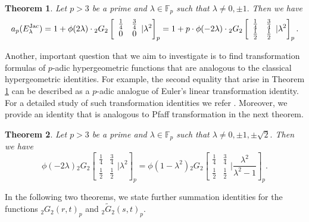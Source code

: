 \documentclass[12pt]{amsart}
\theoremstyle{plain}
\newtheorem{theorem}{Theorem}[section]
\theoremstyle{definition}
\theoremstyle{remark}
\newcommand{\jac}{\text{{\rm{Jac}}}}
\numberwithin{equation}{section}
\begin{document}
	\begin{theorem}\label{theorem-Jacobi}
	Let $p>3$ be a prime and $\lambda\in \mathbb{F}_p$ such that $\lambda\neq0, \pm 1.$ Then we have 
	$$ 
	a_p(E^{\jac}_{\lambda})=1+\phi(2\lambda) \cdot{_2G_2}\left[\begin{array}{cc}
\frac{1}{4}   & \frac{3}{4} \\
  0    & 0  \end{array}|{\lambda^2}\right]_p=1+p\cdot\phi(-2\lambda)\cdot {_2G_2}\left[\begin{array}{cc}
\frac{1}{4}   & \frac{3}{4} \\
  \frac{1}{2}    & \frac{1}{2}  \end{array}|{\lambda^2}\right]_p.$$
\end{theorem}
Another, important question that we aim to investigate is to find transformation formulas of $p$-adic hypergeometric functions that are analogous to the classical hypergeometric identities. For example, the second equality that arise in Theorem \ref{theorem-Jacobi} can be described as a $p$-adic analogue of Euler's linear transformation identity. For a detailed study of such transformation identities we refer \cite{Askey, bailey}. Moreover, we provide an identity that is analogous to Pfaff transformation in the next theorem.	
	
	
	\begin{theorem}\label{theorem-Jacobi trans}
	Let $p>3$ be a prime and $\lambda\in \mathbb{F}_p$ such that $\lambda\neq0, \pm 1, \pm\sqrt{2}.$ Then we have 
	$$ 
	\phi(-2\lambda){_2G_2}\left[\begin{array}{cc}
\frac{1}{4}   & \frac{3}{4} \\
  \frac{1}{2}    & \frac{1}{2}  \end{array}|{\lambda^2}\right]_p=\phi(1-\lambda^2){_2G_2}\left[\begin{array}{cc}
\frac{1}{4}   & \frac{3}{4} \\
  \frac{1}{2}    & \frac{1}{2}  \end{array}|\frac{\lambda^2}{\lambda^2-1}\right]_p.$$ 
  \end{theorem}
	
In the following two theorems, we state further summation identities for the functions ${_2G_2}(r,t)_p$ and $\tilde{_2G_2}(s,t)_p.$	
	
\end{document}

